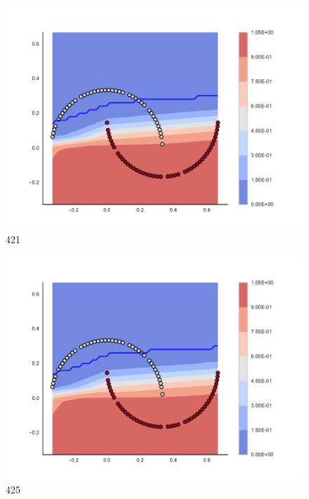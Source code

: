 \begin{subfigure}[b]{0.09\textwidth}
    \includegraphics[clip, trim=2.35cm 1.75cm 4.5cm 0cm,width=\textwidth]{img/convergence/421.pdf}
    \caption{421}
    \label{fig:convergence_421}
\end{subfigure}
%
\begin{subfigure}[b]{0.09\textwidth}
    \includegraphics[clip, trim=2.35cm 1.75cm 4.5cm 0cm,width=\textwidth]{img/convergence/425.pdf}
    \caption{425}
    \label{fig:convergence_425}
\end{subfigure}
%
